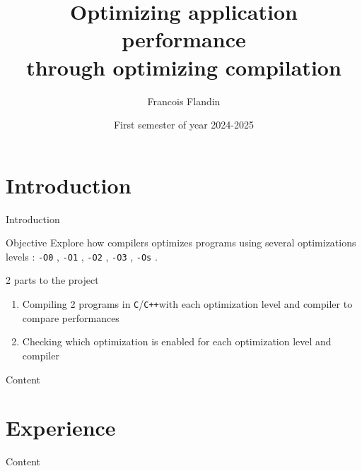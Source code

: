 \documentclass{beamer}
\title{Optimizing application performance \\ through optimizing compilation}
\author{Francois Flandin}
\date{First semester of year 2024-2025}
\newcommand{\optizero}{\texttt{-O0} }
\newcommand{\optione}{\texttt{-O1} }
\newcommand{\optitwo}{\texttt{-O2} }
\newcommand{\optithree}{\texttt{-O3} }
\newcommand{\optisize}{\texttt{-Os} }
\newcommand{\clgg}{\texttt{C}}
\newcommand{\cpp}{\texttt{C++}}
\begin{document}
    
    \maketitle
    
    \section{Introduction}
    \begin{frame}{Introduction}
        \begin{block}{Objective}
            Explore how compilers optimizes programs using several optimizations levels : \optizero, \optione, \optitwo, \optithree, \optisize.
        \end{block}
        \begin{block}{2 parts to the project}
            \begin{enumerate}
            \item Compiling 2 programs in \clgg/\cpp with each optimization level and compiler to compare performances
            \item Checking which optimization is enabled for each optimization level and compiler
            \end{enumerate}
        \end{block}
    \end{frame}
    
    \begin{frame}[noframenumbering]{Content}
        \tableofcontents
    \end{frame}
    
    \section{Experience}
    \begin{frame}[noframenumbering]{Content}
        \tableofcontents[currentsection]
    \end{frame}
    
\end{document}
